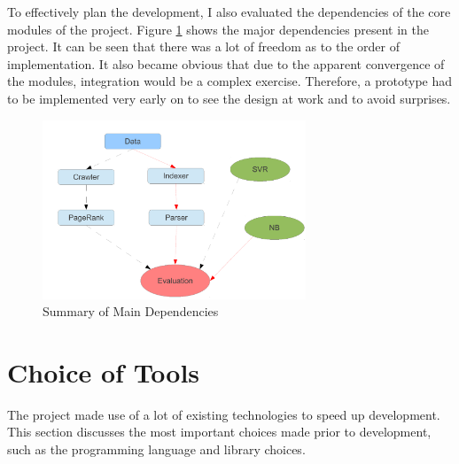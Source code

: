 \documentclass[12pt,notitlepage,twoside]{scrreprt}
\begin{document}
To effectively plan the development, I also evaluated the dependencies of the core modules
of the project. Figure \ref{dep} shows the major dependencies present in the project. It
can be seen that there was a lot of freedom as to the order of implementation. It also
became obvious that due to the apparent convergence of the modules, integration would be a
complex exercise. Therefore, a prototype had to be implemented very early on to see the
design at work and to avoid surprises.
\begin{figure}[h!]
	\centering
	\includegraphics[width=0.7\textwidth]{figs/dep.pdf}
	\caption{Summary of Main Dependencies\label{dep}}
\end{figure}

\section{Choice of Tools}
The project made use of a lot of existing technologies to speed up development. This
section discusses the most important choices made prior to development, such as the
programming language and library choices.
\end{document}
